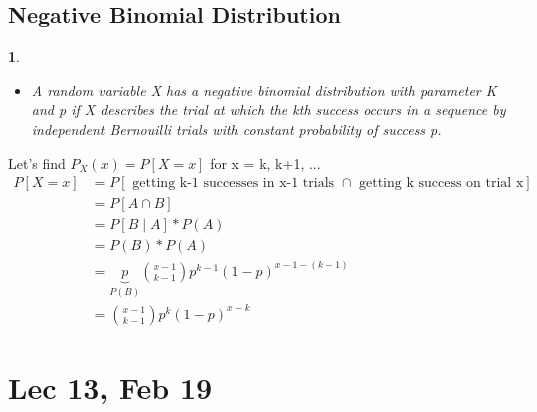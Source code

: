 \documentclass[11pt]{article}
\newtheorem{definition}{\framebox{DEF}}[section]
\newcommand\tab[1][1cm]{\hspace*{#1}}
\begin{document}
        \subsection{Negative Binomial Distribution}
            \begin{definition}\tab
                \begin{itemize}
                    \item A random variable X has a negative binomial distribution with parameter K and p
                            if X describes the trial at which the kth success occurs in a sequence 
                            by independent Bernouilli trials with constant probability of success p.
                \end{itemize}
            \end{definition}

            Let's find $P_X(x) = P[X = x]$ for x = k, k+1, ...
            \begin{align*}
                P[X=x]  &= P[\text{ getting k-1 successes in x-1 trials $\cap$ getting k success on trial x}] \\
                        &= P[A \cap B] \\
                        &= P[B \mid A]* P(A) \\
                        &= P(B)*P(A) \tag{by independence} \\
                        &= \underbrace{p}_{P(B)}  \binom{x-1}{k-1} p^{k-1} (1-p)^{x-1-(k-1)} \tag{for x = k, k+1,...}\\
                        &= \binom{x-1}{k-1}p^k(1-p)^{x-k} \tag{for x = k, k+1, ...}
            \end{align*}
            \newpage
            
    \section{Lec 13, Feb 19}
\end{document}

